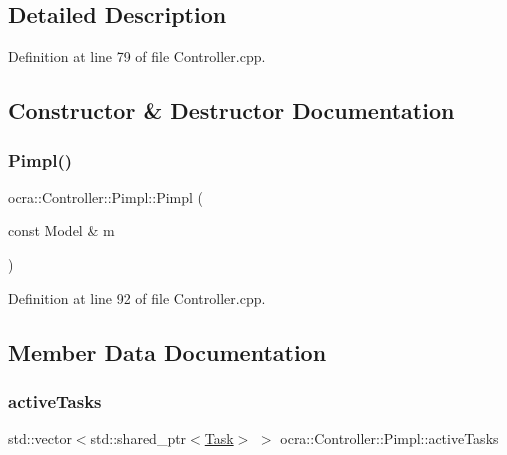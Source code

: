 \subsection{Detailed Description}


Definition at line 79 of file Controller.\+cpp.



\subsection{Constructor \& Destructor Documentation}
\hypertarget{structocra_1_1Controller_1_1Pimpl_ad59ee786ca8b100a87e797cdfc6c15f5}{}\label{structocra_1_1Controller_1_1Pimpl_ad59ee786ca8b100a87e797cdfc6c15f5} 
\subsubsection{\texorpdfstring{Pimpl()}{Pimpl()}}
{\footnotesize\ttfamily ocra\+::\+Controller\+::\+Pimpl\+::\+Pimpl (\begin{DoxyParamCaption}\item[{const Model \&}]{m }\end{DoxyParamCaption})\hspace{0.3cm}{\ttfamily [inline]}}



Definition at line 92 of file Controller.\+cpp.



\subsection{Member Data Documentation}
\hypertarget{structocra_1_1Controller_1_1Pimpl_a721a40c7b21e230a7508995ecfa93d60}{}\label{structocra_1_1Controller_1_1Pimpl_a721a40c7b21e230a7508995ecfa93d60} 
\subsubsection{\texorpdfstring{active\+Tasks}{activeTasks}}
{\footnotesize\ttfamily std\+::vector$<$std\+::shared\+\_\+ptr$<$\hyperlink{classocra_1_1Task}{Task}$>$ $>$ ocra\+::\+Controller\+::\+Pimpl\+::active\+Tasks}



